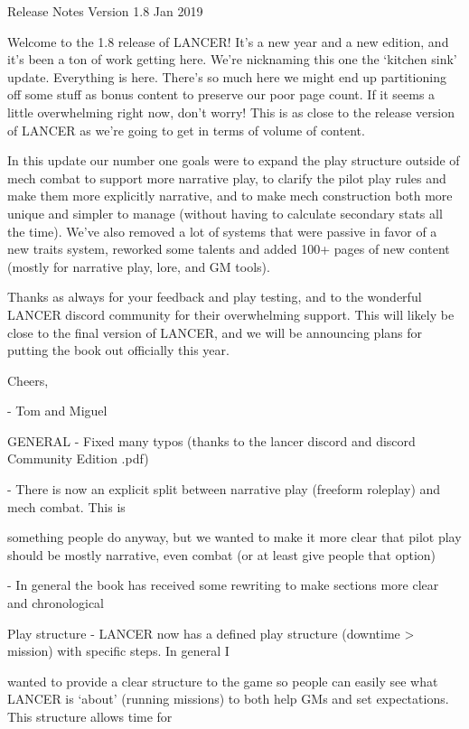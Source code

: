 Release Notes   
Version 1.8  
Jan 2019  

Welcome to the 1.8 release of LANCER! It’s a new year and a new edition, and it’s been a ton of  
work getting here. We’re nicknaming this one the ‘kitchen sink’ update. Everything is here. There’s  
so much here we might end up partitioning off some stuff as bonus content to preserve our poor  
page count. If it seems a little overwhelming right now, don’t worry! This is as close to the release  
version of LANCER as we’re going to get in terms of volume of content.  

In this update our number one goals were to expand the play structure outside of mech combat to  
support more narrative play, to clarify the pilot play rules and make them more explicitly narrative,  
and to make mech construction both more unique and simpler to manage (without having to  
calculate secondary stats all the time). We’ve also removed a lot of systems that were passive in  
favor of a new traits system, reworked some talents and added 100+ pages of new content  
(mostly for narrative play, lore, and GM tools).  

Thanks as always for your feedback and play testing, and to the wonderful LANCER discord  
community for their overwhelming support. This will likely be close to the final version of LANCER,  
and we will be announcing plans for putting the book out officially this year.  

Cheers,  

- Tom and Miguel  

GENERAL  
     -   Fixed many typos (thanks to the lancer discord and discord Community Edition .pdf)
 
     -   There is now an explicit split between narrative play (freeform roleplay) and mech combat.  This is  

         something people do anyway, but we wanted to make it more clear that pilot play should be  
         mostly narrative, even combat (or at least give people that option)
 
     -   In general the book has received some rewriting to make sections more clear and chronological
 

Play structure  
     -   LANCER now has a defined play structure (downtime > mission) with specific steps. In general I  

         wanted to provide a clear structure to the game so people can easily see what LANCER is  
         ‘about’ (running missions) to both help GMs and set expectations. This structure allows time for  

